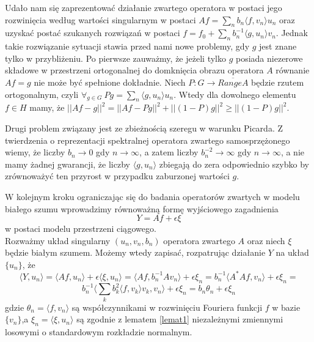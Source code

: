 \documentclass{mwart}
\begin{document}
Udało nam się zaprezentować działanie zwartego operatora w postaci jego rozwinięcia według wartości singularnym w postaci $Af=\sum_nb_n\langle f, v_n\rangle u_n$ oraz uzyskać postać szukanych rozwiązań w postaci $f=f_0+\sum_nb_n^{-1}\langle g, u_n\rangle v_n$. Jednak takie rozwiązanie sytuacji stawia przed nami nowe problemy, gdy $g$ jest znane tylko w przybliżeniu. Po pierwsze zauważmy, że jeżeli tylko $g$ posiada niezerowe składowe w przestrzeni ortogonalnej do domknięcia obrazu operatora $A$ równanie $Af=g$ nie może być spełnione dokładnie. Niech $P\colon G\to \overline{RangeA}$ będzie rzutem ortogonalnym, czyli $\forall_{g\in G}\ Pg=\sum_n\langle g,u_n\rangle u_n$. Wtedy dla dowolnego elementu $f\in H$ mamy, że $||Af-g||^2=||Af-Pg||^2+||(1-P)g||^2\geq ||(1-P)g||^2$.

Drugi problem związany jest ze zbieżnością szeregu w warunku Picarda. Z twierdzenia o reprezentacji spektralnej operatora zwartego samosprzężonego wiemy, że liczby $b_n\to 0$ gdy $n\to \infty$, a zatem liczby $b_n^{-2}\to \infty$ gdy $n \to \infty$, a nie mamy żadnej gwarancji, że liczby $\langle g,u_n\rangle$ zbiegają do zera odpowiednio szybko by zrównoważyć ten przyrost w przypadku zaburzonej wartości $g$.


W kolejnym kroku ograniczając się do badania operatorów zwartych w modelu białego szumu wprowadzimy równoważną formę wyjściowego zagadnienia 
\begin{displaymath}
Y=Af+\epsilon\xi
\end{displaymath}
w postaci modelu przestrzeni ciągowego.\\

Rozważmy układ singularny $(u_n,v_n,b_n)$ operatora zwartego $A$ oraz niech $\xi$ będzie białym szumem. Możemy wtedy zapisać, rozpatrując działanie $Y$ na układ $\{u_n\}$, że
\begin{displaymath}
\langle Y,u_n\rangle=\langle Af,u_n\rangle +\epsilon\langle \xi, u_n\rangle=\langle Af,b_n^{-1}Av_n\rangle+\epsilon \xi_n=b_n^{-1}\langle A^*Af, v_n\rangle+\epsilon \xi_n=
\end{displaymath}
\begin{displaymath}
b_n^{-1}\langle \sum_kb_k^2\langle f, v_k\rangle v_k, v_n\rangle +\epsilon\xi_n=b_n\theta_n+\epsilon\xi_n
\end{displaymath}
gdzie $\theta_n=\langle f,v_n\rangle$ są współczynnikami w rozwinięciu Fouriera funkcji $f$ w bazie $\{v_n\}$,a $\xi_n=\langle \xi, u_n\rangle$ są zgodnie z lematem \ref{lemat1} niezależnymi zmiennymi losowymi o standardowym rozkładzie normalnym.
\end{document}

